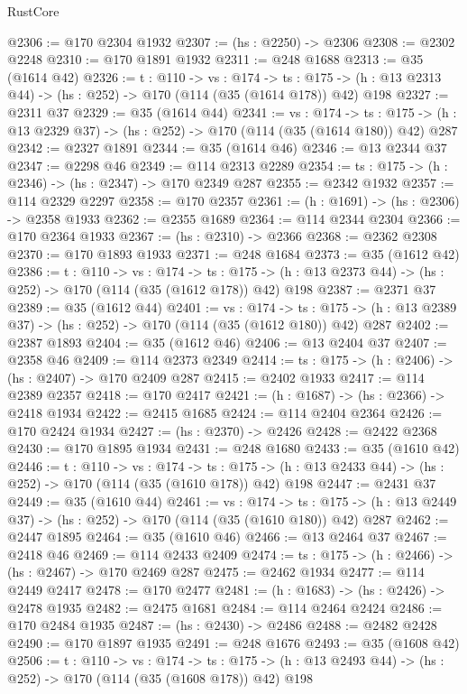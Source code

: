 \begin{lexlean}{RustCore}
\begin{coremodule}
@2306 := @170 @2304 @1932
@2307 := (hs : @2250) -> @2306
@2308 := @2302 @2248
@2310 := @170 @1891 @1932
@2311 := @248 @1688
@2313 := @35 (@1614 @42)
@2326 := {t : @110} ->
  {vs : @174} ->
  {ts : @175} -> (h : @13 @2313 @44) -> (hs : @252) -> @170 (@114 (@35 (@1614 @178)) @42) @198
@2327 := @2311 @37
@2329 := @35 (@1614 @44)
@2341 := {vs : @174} ->
  {ts : @175} -> (h : @13 @2329 @37) -> (hs : @252) -> @170 (@114 (@35 (@1614 @180)) @42) @287
@2342 := @2327 @1891
@2344 := @35 (@1614 @46)
@2346 := @13 @2344 @37
@2347 := @2298 @46
@2349 := @114 @2313 @2289
@2354 := {ts : @175} -> (h : @2346) -> (hs : @2347) -> @170 @2349 @287
@2355 := @2342 @1932
@2357 := @114 @2329 @2297
@2358 := @170 @2357
@2361 := (h : @1691) -> (hs : @2306) -> @2358 @1933
@2362 := @2355 @1689
@2364 := @114 @2344 @2304
@2366 := @170 @2364 @1933
@2367 := (hs : @2310) -> @2366
@2368 := @2362 @2308
@2370 := @170 @1893 @1933
@2371 := @248 @1684
@2373 := @35 (@1612 @42)
@2386 := {t : @110} ->
  {vs : @174} ->
  {ts : @175} -> (h : @13 @2373 @44) -> (hs : @252) -> @170 (@114 (@35 (@1612 @178)) @42) @198
@2387 := @2371 @37
@2389 := @35 (@1612 @44)
@2401 := {vs : @174} ->
  {ts : @175} -> (h : @13 @2389 @37) -> (hs : @252) -> @170 (@114 (@35 (@1612 @180)) @42) @287
@2402 := @2387 @1893
@2404 := @35 (@1612 @46)
@2406 := @13 @2404 @37
@2407 := @2358 @46
@2409 := @114 @2373 @2349
@2414 := {ts : @175} -> (h : @2406) -> (hs : @2407) -> @170 @2409 @287
@2415 := @2402 @1933
@2417 := @114 @2389 @2357
@2418 := @170 @2417
@2421 := (h : @1687) -> (hs : @2366) -> @2418 @1934
@2422 := @2415 @1685
@2424 := @114 @2404 @2364
@2426 := @170 @2424 @1934
@2427 := (hs : @2370) -> @2426
@2428 := @2422 @2368
@2430 := @170 @1895 @1934
@2431 := @248 @1680
@2433 := @35 (@1610 @42)
@2446 := {t : @110} ->
  {vs : @174} ->
  {ts : @175} -> (h : @13 @2433 @44) -> (hs : @252) -> @170 (@114 (@35 (@1610 @178)) @42) @198
@2447 := @2431 @37
@2449 := @35 (@1610 @44)
@2461 := {vs : @174} ->
  {ts : @175} -> (h : @13 @2449 @37) -> (hs : @252) -> @170 (@114 (@35 (@1610 @180)) @42) @287
@2462 := @2447 @1895
@2464 := @35 (@1610 @46)
@2466 := @13 @2464 @37
@2467 := @2418 @46
@2469 := @114 @2433 @2409
@2474 := {ts : @175} -> (h : @2466) -> (hs : @2467) -> @170 @2469 @287
@2475 := @2462 @1934
@2477 := @114 @2449 @2417
@2478 := @170 @2477
@2481 := (h : @1683) -> (hs : @2426) -> @2478 @1935
@2482 := @2475 @1681
@2484 := @114 @2464 @2424
@2486 := @170 @2484 @1935
@2487 := (hs : @2430) -> @2486
@2488 := @2482 @2428
@2490 := @170 @1897 @1935
@2491 := @248 @1676
@2493 := @35 (@1608 @42)
@2506 := {t : @110} ->
  {vs : @174} ->
  {ts : @175} -> (h : @13 @2493 @44) -> (hs : @252) -> @170 (@114 (@35 (@1608 @178)) @42) @198

\end{coremodule}
\end{lexlean}
